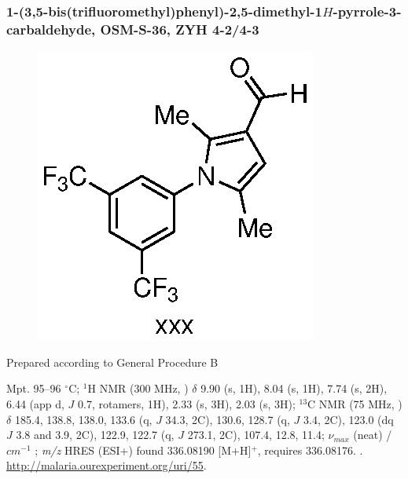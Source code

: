 \documentclass[12pt, a4paper,titlepage]{article}
\begin{document}
{\subsubsection*{1-(3,5-bis(trifluoromethyl)phenyl)-2,5-dimethyl-1$H$-pyrrole-3-carbaldehyde, OSM-S-36, ZYH 4-2/4-3}
\label{exp:ZYH4}
	\begin{figure}[H]
	\begin{center}
	\includegraphics{exp/ZYH4.eps}
	\end{center}
	\vspace{-25pt}	
	\end{figure}
	
Prepared according to General Procedure B

Mpt. 95--96 $^\circ$C; 
$^1$H NMR (300 MHz, ) $\delta$ 9.90 (s, 1H), 8.04 (s, 1H), 7.74 (s, 2H), 6.44 (app d, $J$ 0.7, rotamers, 1H), 2.33 (s, 3H), 2.03 (s, 3H);
  $^{13}$C NMR (75 MHz, ) $\delta$ 185.4, 138.8, 138.0, 133.6 (q, $J$ 34.3, 2C), 130.6, 128.7 (q, $J$ 3.4, 2C), 123.0 (dq $J$ 3.8 and 3.9, 2C), 122.9, 122.7 (q, $J$ 273.1, 2C), 107.4, 12.8, 11.4;
 $\nu_{max}$ (neat) /$cm^{-1}$ ; 
\emph{m/z} HRES (ESI+) found 336.08190 [M+H]$^+$,  requires 336.08176.
. 
\url{http://malaria.ourexperiment.org/uri/55}. 

}
\end{document}
